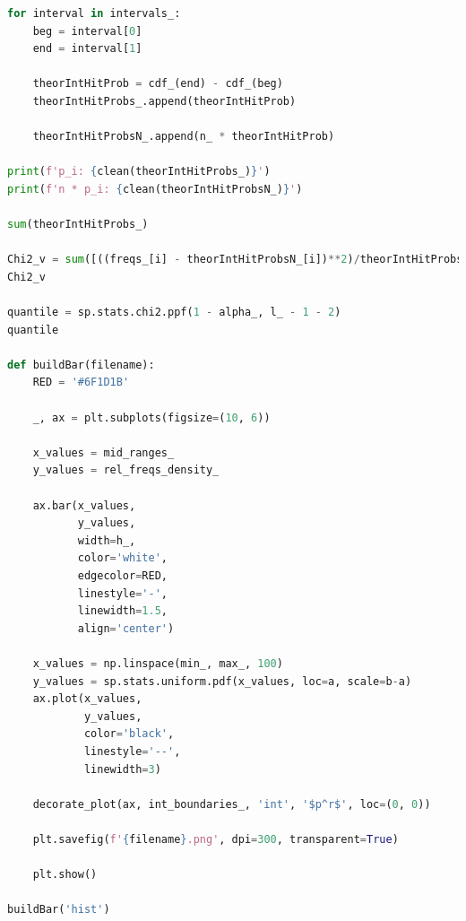 \documentclass[a4paper, 14pt]{extarticle}
\begin{document}
\begin{center}
\begin{lstlisting}[language=Python]
for interval in intervals_:
    beg = interval[0]
    end = interval[1]

    theorIntHitProb = cdf_(end) - cdf_(beg)
    theorIntHitProbs_.append(theorIntHitProb)

    theorIntHitProbsN_.append(n_ * theorIntHitProb)

print(f'p_i: {clean(theorIntHitProbs_)}')
print(f'n * p_i: {clean(theorIntHitProbsN_)}')

sum(theorIntHitProbs_)

Chi2_v = sum([((freqs_[i] - theorIntHitProbsN_[i])**2)/theorIntHitProbsN_[i] for i in range(l_)])
Chi2_v

quantile = sp.stats.chi2.ppf(1 - alpha_, l_ - 1 - 2)
quantile

def buildBar(filename):
    RED = '#6F1D1B'

    _, ax = plt.subplots(figsize=(10, 6))

    x_values = mid_ranges_
    y_values = rel_freqs_density_

    ax.bar(x_values, 
           y_values, 
           width=h_, 
           color='white',
           edgecolor=RED, 
           linestyle='-', 
           linewidth=1.5, 
           align='center')
    
    x_values = np.linspace(min_, max_, 100)
    y_values = sp.stats.uniform.pdf(x_values, loc=a, scale=b-a)
    ax.plot(x_values, 
            y_values, 
            color='black',
            linestyle='--', 
            linewidth=3)

    decorate_plot(ax, int_boundaries_, 'int', '$p^r$', loc=(0, 0))

    plt.savefig(f'{filename}.png', dpi=300, transparent=True)

    plt.show()

buildBar('hist')
    \end{lstlisting}
\end{center}
\end{document}

